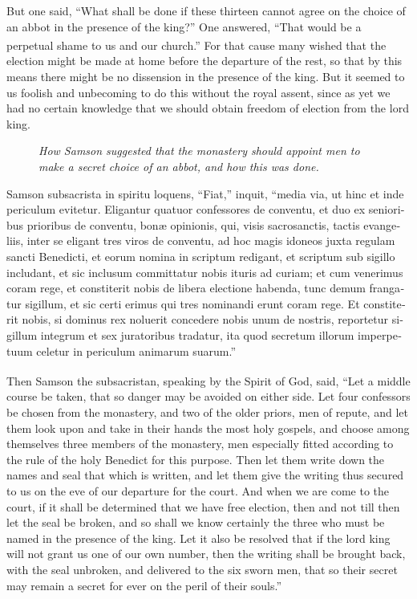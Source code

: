 \documentclass[10pt]{book}
\newcounter{engnote}
\newcommand{\engnotenum}{\textsuperscript{\arabic{engnote}\stepcounter{engnote}}}
\newcommand{\engnotetext}[1]{\vphantom{\footnotemark{}}\footnotetext{#1}}
\newcommand{\blockhead}[4][]{
\begin{figure}
\centering
\vspace{#4}
\parbox{2.75cm}{\begin{center}\footnotesize \color{BrickRed} \emph{#2}\\ #1 \end{center}}
\end{figure}
}
\begin{document}
\begin{paracol}{2}
\switchcolumn

But one said, ``What shall be done if these thirteen cannot agree on the choice of an abbot in the presence of the king?'' One answered, ``That would be a perpetual shame\engnotenum{} to us and our church.'' For that cause many wished that the election might be made at home before the departure of the rest, so that by this means there might be no dissension in the presence of the king. But it seemed to us foolish and unbecoming to do this without the royal assent, since as yet we had no certain knowledge that we should obtain freedom of election from the lord king.

\switchcolumn*

\begin{otherlanguage}{latin}
\blockhead{How Samson suggested that the monastery should appoint men to make a secret choice of an abbot, and how this was done.}{5}{-0.6cm}
Samson subsacrista in spiritu\engnotetext{I.\ Cor.\ xii., \oldstylenums{3}.} loquens, ``Fiat,'' inquit, ``media via, ut hinc et inde periculum evitetur. Eligantur quatuor confessores de conventu, et duo ex senioribus prioribus de conventu, bon\ae{} opinionis, qui, visis sacrosanctis, tactis evangeliis, inter se eligant tres viros de conventu, ad hoc magis idoneos juxta regulam sancti Benedicti, et eorum nomina in scriptum redigant, et scriptum sub sigillo includant, et sic inclusum committatur nobis ituris ad curiam; et cum venerimus coram rege, et constiterit nobis de libera electione habenda, tunc demum frangatur sigillum, et sic certi erimus qui tres nominandi erunt coram rege. Et constiterit nobis, si dominus rex noluerit concedere nobis unum de nostris, reportetur sigillum integrum et sex juratoribus tradatur, ita quod secretum illorum imperpetuum celetur in periculum animarum suarum.''

\end{otherlanguage}

\switchcolumn

Then Samson the subsacristan, speaking by the Spirit of God,\engnotenum{} said, ``Let a middle course be taken, that so danger may be avoided on either side. Let four confessors be chosen from the monastery, and two of the older priors, men of repute, and let them look upon and take in their hands the most holy gospels, and choose among themselves three members of the monastery, men especially fitted according to the rule of the holy Benedict for this purpose. Then let them write down the names and seal that which is written, and let them give the writing thus secured to us on the eve of our departure for the court. And when we are come to the court, if it shall be determined that we have free election, then and not till then let the seal be broken, and so shall we know certainly the three who must be named in the presence of the king. Let it also be resolved that if the lord king will not grant us one of our own number, then the writing shall be brought back, with the seal unbroken, and delivered to the six sworn men, that so their secret may remain a secret for ever on the peril of their souls.''


\end{paracol}
\end{document}
